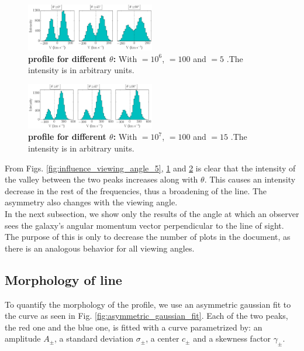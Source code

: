 \documentclass[twocolappendix]{latex/emulateapj}
\begin{document}
\begin{figure}[h!]
	\begin{center}
		\includegraphics[width=0.5\textwidth]{./figures/influence_viewing_angle_6}
	\end{center}
	\caption{\textbf{\lya profile for different $\theta$:} With \tauh$=10^6$, \vrot$=100$ \kms and \vout$=5$ \kms.The intensity is in arbitrary units.
		\label{fig:influence_viewing_angle_6}}
\end{figure}

\begin{figure}[h!]
	\begin{center}
		\includegraphics[width=0.5\textwidth]{./figures/influence_viewing_angle_7}
	\end{center}
	\caption{\textbf{\lya profile for different $\theta$:} With \tauh$=10^7$, \vrot$=100$ \kms and \vout$=15$ \kms.The intensity is in arbitrary units.
		\label{fig:influence_viewing_angle_7}}
\end{figure}

From Figs. \ref{fig:influence_viewing_angle_5}, \ref{fig:influence_viewing_angle_6} and \ref{fig:influence_viewing_angle_7} is clear that the intensity of the valley between the two peaks increases along with $\theta$. This causes an intensity decrease in the rest of the frequencies, thus a broadening of the line. The asymmetry also changes with the viewing angle.\\

In the next subsection, we show only the results of the angle at which an observer sees the galaxy's angular momentum vector perpendicular to the line of sight. The purpose of this is only to decrease the number of plots in the document, as there is an analogous behavior for all viewing angles. \\

\subsection{Morphology of \lya line}
To quantify the morphology of the \lya profile, we use an asymmetric gaussian fit to the curve as seen in Fig. \ref{fig:asymmetric_gaussian_fit}. Each of the two peaks, the red one and the blue one, is fitted with a curve parametrized by: an amplitude $A_{\pm}$, a standard deviation $\sigma_{\pm}$, a center $c_{\pm}$ and a skewness factor $\gamma_{\pm}$.\\
\end{document}
